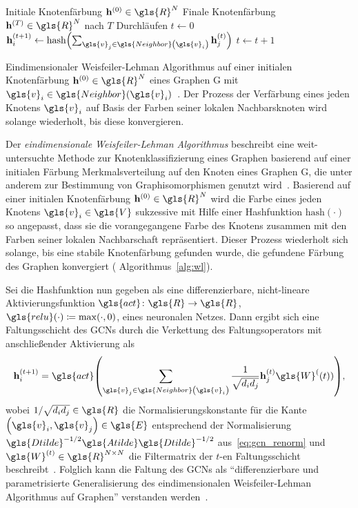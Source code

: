 \begin{algorithm}[t]
\centering
\begin{algorithmic}
  \REQUIRE{} Initiale Knotenfärbung $\ve{h}^{\left(0\right)} \in \gls{R}^N$
  \ENSURE{} Finale Knotenfärbung $\ve{h}^{\left(T\right)} \in \gls{R}^N$ nach $T$ Durchläufen
  \STATE{} $t \leftarrow 0$
  \REPEAT{}
      \STATE{} $\ve{h}^{\left(t+1\right)}_i \leftarrow \mathrm{hash}\left(\sum_{\gls{v}_j \in \gls{Neighbor}\left(\gls{v}_i\right)} \ve{h}^{\left(t\right)}_j\right)$
    \ENDFOR{}
    \STATE{} $t \leftarrow t + 1$
\end{algorithmic}
  \caption[Weisfeiler-Lehman Algorithmus]{Eindimensionaler Weisfeiler-Lehman Algorithmus auf einer initialen Knotenfärbung $\ve{h}^{\left(0\right)} \in \gls{R}^N$ eines Graphen \gls{G} mit $\gls{v}_i \in \gls{Neighbor}\left(\gls{v}_i\right)$~\cite{wl}. Der Prozess der Verfärbung eines jeden Knotens $\gls{v}_i$ auf Basis der Farben seiner lokalen Nachbarsknoten wird solange wiederholt, bis diese konvergieren.}
\label{alg:wl}
\end{algorithm}

Der \emph{eindimensionale Weis\-fei\-ler-Lehman Algorithmus} beschreibt eine weit-untersuchte Methode zur Knotenklassifizierung eines Graphen basierend auf einer initialen Färbung \bzw{} Merkmalsverteilung auf den Knoten eines Graphen \gls{G}, die unter anderem zur Bestimmung von Graphisomorphismen genutzt wird~\cite{douglas}.
Basierend auf einer initialen Knotenfärbung $\ve{h}^{\left(0\right)} \in \gls{R}^N$ wird die Farbe eines jeden Knotens $\gls{v}_i \in \gls{V}$ sukzessive mit Hilfe einer Hashfunktion $\mathrm{hash}\left(\cdot\right)$ so angepasst, dass sie die vorangegangene Farbe des Knotens zusammen mit den Farben seiner lokalen Nachbarschaft repräsentiert.
Dieser Prozess wiederholt sich solange, bis eine stabile Knotenfärbung gefunden wurde, \dhe{} die gefundene Färbung des Graphen konvergiert (\vgl{} Algorithmus~\ref{alg:wl}).

Sei die Hashfunktion nun gegeben als eine differenzierbare, nicht-lineare Aktivierungsfunktion $\gls{act} \colon \gls{R} \to \gls{R}$, \bspw{} $\gls{relu}\left(\cdot\right) \coloneqq \max\left(\cdot, 0\right)$, eines neuronalen Netzes.
Dann ergibt sich eine Faltungsschicht des \glspl{GCN} durch die Verkettung des Faltungsoperators mit anschließender Aktivierung als
\begin{equation*}
  \ve{h}^{\left(t+1\right)}_i = \gls{act}\left(\sum_{\gls{v}_j \in \gls{Neighbor}\left(\gls{v}_i\right)} \frac{1}{\sqrt{d_i d_j}} \ve{h}^{\left(t\right)}_j \gls{W}^(\left(t\right)) \right),
\end{equation*}
wobei $1/\sqrt{d_i d_j} \in \gls{R}$ die Normalisierungskonstante für die Kante $\left(\gls{v}_i, \gls{v}_j\right) \in \gls{E}$ entsprechend der Normalisierung $\gls{Dtilde}^{-1/2}\gls{Atilde}\gls{Dtilde}^{-1/2}$ aus~\eqref{eq:gcn_renorm} und $\gls{W}^{\left(t\right)} \in \gls{R}^{N \times N}$ die Filtermatrix der $t$-en Faltungsschicht beschreibt~\cite{gcn}.
Folglich kann die Faltung des \glspl{GCN} als \enquote{differenzierbare und parametrisierte Generalisierung des eindimensionalen Weisfeiler-Lehman Algorithmus auf Graphen} verstanden werden~\cite{gcn}.
